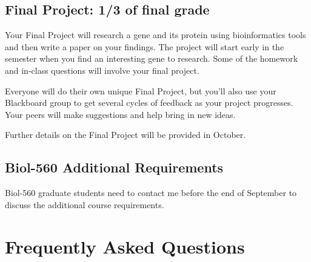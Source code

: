 \documentclass[12pt]{article}
\begin{document}
\subsection{Final Project: 1/3  of final grade}
\label{sec:final-project-30}


Your Final Project will research a gene and its protein using bioinformatics
tools and then write a paper on your findings.  The project will start early in the
semester when you find an interesting gene to research.  Some of the homework
and in-class questions will involve your final project.


Everyone will do their own unique Final Project, but you'll also use your
Blackboard group to get several cycles of feedback as your project progresses.  Your peers
will make suggestions and help bring in new ideas.


Further details on the Final Project will be provided in October.


\subsection{Biol-560 Additional Requirements}
Biol-560 graduate students need to contact me before the end of September to discuss the additional course requirements.

\section{Frequently Asked Questions}
\label{sec:freq-asked-quest}
\end{document}
